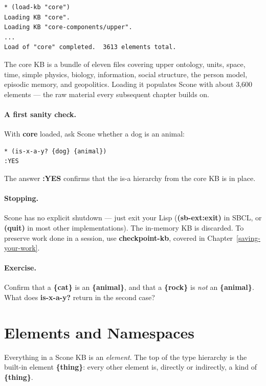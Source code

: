 \documentclass[titlepage,twoside,openright,11pt]{article}
\begin{document}
\begin{verbatim}
* (load-kb "core")
Loading KB "core".
Loading KB "core-components/upper".
...
Load of "core" completed.  3613 elements total.
\end{verbatim}

The core KB is a bundle of eleven files covering upper ontology,
units, space, time, simple physics, biology, information, social
structure, the person model, episodic memory, and geopolitics.
Loading it populates Scone with about 3,600 elements --- the raw
material every subsequent chapter builds on.

\paragraph{A first sanity check.}
With \textbf{core} loaded, ask Scone whether a dog is an animal:

\begin{verbatim}
* (is-x-a-y? {dog} {animal})
:YES
\end{verbatim}

The answer \textbf{:YES} confirms that the is-a hierarchy from the
core KB is in place.

\paragraph{Stopping.}
Scone has no explicit shutdown --- just exit your Lisp
(\textbf{(sb-ext:exit)} in SBCL, or \textbf{(quit)} in most other
implementations). The in-memory KB is discarded. To preserve work
done in a session, use \textbf{checkpoint-kb}, covered in
Chapter~\ref{saving-your-work}.

\paragraph{Exercise.}
Confirm that a \textbf{\{cat\}} is an \textbf{\{animal\}}, and that
a \textbf{\{rock\}} is \emph{not} an \textbf{\{animal\}}. What does
\textbf{is-x-a-y?} return in the second case?

\section{Elements and Namespaces}\label{elements-and-namespaces}

Everything in a Scone KB is an \emph{element}. The top of the
type hierarchy is the built-in element \textbf{\{thing\}}: every
other element is, directly or indirectly, a kind of \textbf{\{thing\}}.
\end{document}
